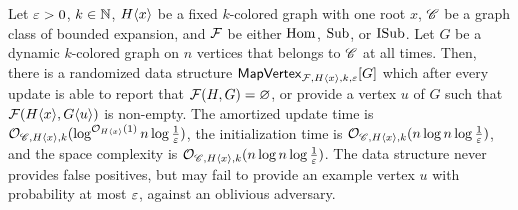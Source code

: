 \begin{lemma} \label{lem:map-vertex}
	Let $\varepsilon>0$, $k\in \mathbb{N}$, $H\langle x\rangle$ be a fixed $k$-colored graph with one root $x$, $\mathscr C$ be a graph class of bounded expansion, and $\mathcal{F}$ be either $\mathrm{Hom}$, $\mathrm{Sub}$, or $\mathrm{ISub}$. 
	Let $G$ be a dynamic $k$-colored graph on $n$ vertices that belongs to $\mathscr C$ at all times.
	Then, there is a randomized data structure $\mathsf{MapVertex}_{\mathcal{F}, H\langle x\rangle, k,\varepsilon}[G]$ which after every update is able to report that $\mathcal{F}(H,G)=\varnothing$, or provide a vertex $u$ of $G$ such that $\mathcal{F}(H\langle x\rangle,G\langle u\rangle)$ is non-empty. The amortized update time is $\mathcal{O}_{\mathscr C, H\langle x\rangle, k}(\log^{\mathcal{O}_{H\langle x\rangle}(1)} n \log{\frac{1}{\varepsilon}})$, the initialization time is $\mathcal{O}_{\mathscr C, H\langle x\rangle, k}(n \log n \log {\tfrac{1}{\varepsilon}})$, and the space complexity is $\mathcal{O}_{\mathscr C, H\langle x\rangle, k}(n \log n \log {\tfrac{1}{\varepsilon}})$. The data structure never provides false positives, but may fail to provide an example vertex $u$ with probability at most $\varepsilon$, against an oblivious adversary.
\end{lemma}
